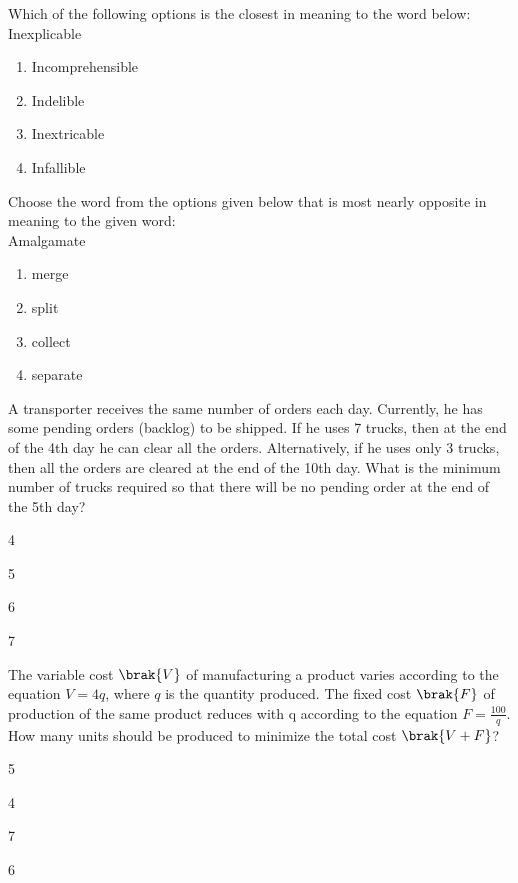 \item Which of the following options is the closest in meaning to the word below:\\
Inexplicable
\begin{enumerate}
\item Incomprehensible
\item Indelible
\item Inextricable
\item Infallible
\end{enumerate}
\item Choose the word from the options given below that is most nearly opposite in meaning to the given word:\\
Amalgamate
\begin{enumerate}
\item merge
\item split
\item collect
\item separate
\end{enumerate}
\item A transporter receives the same number of orders each day. Currently, he has some pending orders (backlog) to be shipped. If he uses 7 trucks, then at the end of the 4th day he can clear all the orders. Alternatively, if he uses only 3 trucks, then all the orders are cleared at the end of the 10th day. What is the minimum number of trucks required so that there will be no pending order at the end of the 5th day?
\begin{enumerate}
\begin{multicols}{4}
\item 4
\item 5
\item 6
\item 7
\end{multicols}
\end{enumerate}
\item The variable cost $\brak{V}$ of manufacturing a product varies according to the equation $V = 4q$, where $q$ is the quantity produced. The fixed cost $\brak{F}$ of production of the same product reduces with q according to the equation $F = \frac{100}{q}$. How many units should be produced to minimize the total cost $\brak{V+F}$?
\begin{enumerate}
\begin{multicols}{4}
\item 5
\item 4
\item 7
\item 6
\end{multicols}
\end{enumerate}
